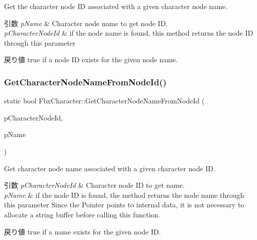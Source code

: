 Get the character node ID associated with a given character node name. 
\begin{DoxyParams}{引数}
{\em p\+Name} & Character node name to get node ID. \\
\hline
{\em p\+Character\+Node\+Id} & if the node name is found, this method returns the node ID through this parameter \\
\hline
\end{DoxyParams}
\begin{DoxyReturn}{戻り値}
{\ttfamily true} if a node ID exists for the given node name. 
\end{DoxyReturn}
\mbox{\label{class_fbx_character_ad7162048fc5ab287acafcef3a0088c38}} 
\subsubsection{\texorpdfstring{Get\+Character\+Node\+Name\+From\+Node\+Id()}{GetCharacterNodeNameFromNodeId()}}
{\footnotesize\ttfamily static bool Fbx\+Character\+::\+Get\+Character\+Node\+Name\+From\+Node\+Id (\begin{DoxyParamCaption}\item[{\hyperlink{class_fbx_character_ad75bf42026e435ac0ff4d7ece2317be4}{E\+Node\+Id}}]{p\+Character\+Node\+Id,  }\item[{char $\ast$\&}]{p\+Name }\end{DoxyParamCaption})\hspace{0.3cm}{\ttfamily [static]}}

Get character node name associated with a given character node ID. 
\begin{DoxyParams}{引数}
{\em p\+Character\+Node\+Id} & Character node ID to get name. \\
\hline
{\em p\+Name} & if the node ID is found, the method returns the node name through this parameter Since the Pointer points to internal data, it is not necessary to allocate a string buffer before calling this function. \\
\hline
\end{DoxyParams}
\begin{DoxyReturn}{戻り値}
{\ttfamily true} if a name exists for the given node ID. 
\end{DoxyReturn}
\mbox{\label{class_fbx_character_ab6c9f1540880fa72c17a27d19ff11425}} 

